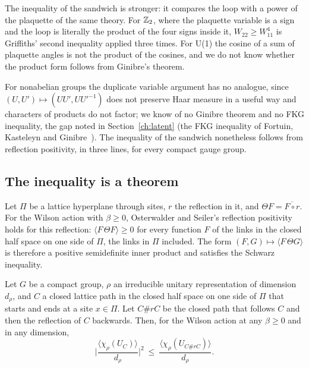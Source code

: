 The inequality of the sandwich is stronger: it compares the loop with a power of the plaquette of the same theory. For $\mathbb{Z}_2$, where the plaquette variable is a sign and the loop is literally the product of the four signs inside it, $W_{22}\ge W_{11}^4$ is Griffiths' second inequality applied three times. For U(1) the cosine of a sum of plaquette angles is not the product of the cosines, and we do not know whether the product form follows from Ginibre's theorem.

For nonabelian groups the duplicate variable argument has no analogue, since $(U,U')\mapsto(UU',UU'^{-1})$ does not preserve Haar measure in a useful way and characters of products do not factor; we know of no Ginibre theorem and no FKG inequality, the gap noted in Section~\ref{ch:latent} (the FKG inequality of Fortuin, Kasteleyn and Ginibre~\cite{FKG71}). The inequality of the sandwich nonetheless follows from reflection positivity, in three lines, for every compact gauge group.

\subsection{The inequality is a theorem}

Let $\Pi$ be a lattice hyperplane through sites, $r$ the reflection in it, and $\Theta F=\overline{F\circ r}$. For the Wilson action with $\beta\ge0$, Osterwalder and Seiler's reflection positivity \cite{OSe} holds for this reflection: $\langle F\,\Theta F\rangle\ge0$ for every function $F$ of the links in the closed half space on one side of $\Pi$, the links in $\Pi$ included. The form $(F,G)\mapsto\langle F\,\Theta G\rangle$ is therefore a positive semidefinite inner product and satisfies the Schwarz inequality.

\begin{theorem}\label{thm:doubling}
Let $G$ be a compact group, $\rho$ an irreducible unitary representation of dimension $d_\rho$, and $C$ a closed lattice path in the closed half space on one side of $\Pi$ that starts and ends at a site $x\in\Pi$. Let $C\#rC$ be the closed path that follows $C$ and then the reflection of $C$ backwards. Then, for the Wilson action at any $\beta\ge0$ and in any dimension,
\[
\Big|\frac{\langle\chi_\rho(U_C)\rangle}{d_\rho}\Big|^2\ \le\ \frac{\langle\chi_\rho(U_{C\#rC})\rangle}{d_\rho}.
\]
\end{theorem}

